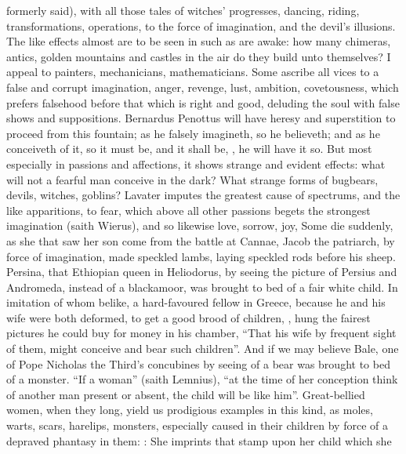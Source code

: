 formerly said), with all those tales of witches' progresses, dancing, riding,
transformations, operations, \etc{} to the force of
imagination, and the devil's
illusions. The like effects almost are to be seen in such as are awake: how
many chimeras, antics, golden mountains and castles in the air do they build
unto themselves? I appeal to painters, mechanicians, mathematicians. Some
ascribe all vices to a false and corrupt imagination, anger, revenge, lust,
ambition, covetousness, which prefers falsehood before that which is right and
good, deluding the soul with false shows and suppositions.
Bernardus Penottus will have heresy and superstition to
proceed from this fountain; as he falsely imagineth, so he believeth; and as he
conceiveth of it, so it must be, and it shall be, , he will
have it so. But most especially in passions and affections, it shows strange
and evident effects: what will not a fearful man conceive in the dark? What
strange forms of bugbears, devils, witches, goblins? Lavater imputes the
greatest cause of spectrums, and the like apparitions, to fear, which above all
other passions begets the strongest imagination (saith
Wierus), and so likewise love, sorrow, joy, \etc{} Some
die suddenly, as she that saw her son come from the battle at Cannae, \etc{}
Jacob the patriarch, by force of imagination, made speckled lambs, laying
speckled rods before his sheep. Persina, that Ethiopian queen in Heliodorus, by
seeing the picture of Persius and Andromeda, instead of a blackamoor, was
brought to bed of a fair white child. In imitation of whom belike, a
hard-favoured fellow in Greece, because he and his wife were both deformed, to
get a good brood of children, , \etc{} hung the fairest pictures he could buy for money in his
chamber, \enquote{That his wife by frequent sight of them, might conceive and bear such
children}. And if we may believe Bale, one of Pope Nicholas the Third's
concubines by seeing of a bear was brought to bed of a
monster. \enquote{If a woman} (saith Lemnius), \enquote{at the time of her
conception think of another man present or absent, the child will be like him}.
Great-bellied women, when they long, yield us prodigious examples in this kind,
as moles, warts, scars, harelips, monsters, especially caused in their children
by force of a depraved phantasy in them: : She imprints that stamp upon her child which she

